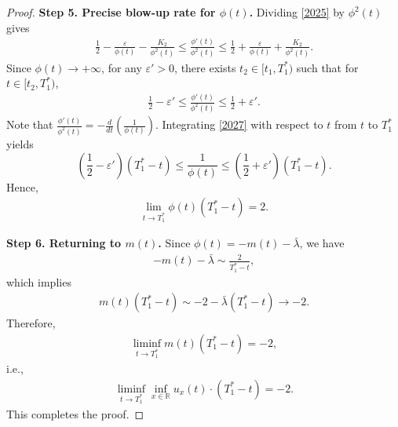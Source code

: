 \documentclass[10pt,a4paper]{amsart}
\begin{document}
\begin{proof}
\noindent\textbf{Step 5. Precise blow-up rate for $\phi(t)$.}
Dividing \eqref{2025} by $\phi^2(t)$ gives
\begin{align}
\frac{1}{2} - \frac{\varepsilon}{\phi(t)} - \frac{K_2}{\phi^2(t)} \leq \frac{\phi'(t)}{\phi^2(t)} \leq \frac{1}{2} + \frac{\varepsilon}{\phi(t)} + \frac{K_2}{\phi^2(t)}.
\label{2026}
\end{align}
Since $\phi(t) \to +\infty$, for any $\varepsilon' > 0$, there exists $t_2 \in [t_1, T_{1}^*)$ such that for $t \in [t_2, T_{1}^*)$,
\begin{align}
\frac{1}{2} - \varepsilon' \leq \frac{\phi'(t)}{\phi^2(t)} \leq \frac{1}{2} + \varepsilon'.
\label{2027}
\end{align}
Note that $\frac{\phi'(t)}{\phi^2(t)} = -\frac{d}{dt} \left( \frac{1}{\phi(t)} \right)$. Integrating \eqref{2027} with respect to $t$ from $t$ to $T_{1}^*$ yields
$$ \left( \frac{1}{2} - \varepsilon' \right)(T_{1}^* - t) \leq \frac{1}{\phi(t)} \leq \left( \frac{1}{2} + \varepsilon' \right)(T_{1}^* - t).
$$
Hence,
\begin{align}
\lim_{t \to T_{1}^*} \phi(t)(T_{1}^* - t) = 2.
\label{2028}
\end{align}

\noindent\textbf{Step 6. Returning to $m(t)$.}
Since $\phi(t) = -m(t) - \bar\lambda$, we have
\begin{align*}
-m(t) - \bar\lambda \sim \frac{2}{T_{1}^* - t},
\end{align*}
which implies
\begin{align*}
m(t)(T_{1}^* - t) \sim -2 - \bar\lambda (T_{1}^* - t) \to -2.
\end{align*}
Therefore,
\begin{align*}
\liminf_{t \to T_{1}^*} m(t)(T_{1}^* - t) = -2,
\end{align*}
i.e.,
\begin{align*}
\liminf_{t \to T_{1}^*} \inf_{x\in \mathbb{R}}u_{x}(t) \cdot (T_{1}^* - t) = -2.
\end{align*}
This completes the proof.
\end{proof}
\end{document}
